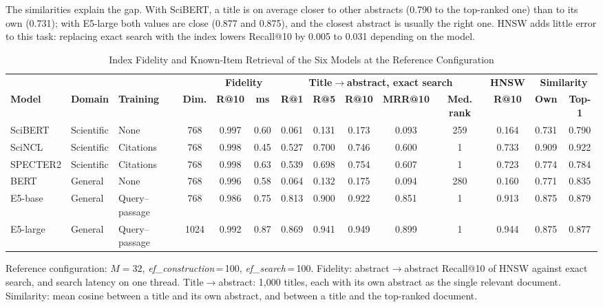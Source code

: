 \documentclass[conference, letterpaper]{IEEEtran}
\begin{document}
The similarities explain the gap. With SciBERT, a title is on average closer to other abstracts (0.790 to the top-ranked one) than to its own (0.731); with E5-large both values are close (0.877 and 0.875), and the closest abstract is usually the right one. HNSW adds little error to this task: replacing exact search with the index lowers Recall@10 by 0.005 to 0.031 depending on the model.

\begin{table}[!t]
\centering
\begin{threeparttable}
\caption{Index Fidelity and Known-Item Retrieval of the Six Models at the Reference Configuration}
\label{tab:models}
\footnotesize
\setlength{\tabcolsep}{4.2pt}
\begin{tabular}{@{}lllc cc ccccc c cc@{}}
\toprule
 & & & & \multicolumn{2}{c}{\textbf{Fidelity}} & \multicolumn{5}{c}{\textbf{Title$\rightarrow$abstract, exact search}} & \textbf{HNSW} & \multicolumn{2}{c}{\textbf{Similarity}} \\
\cmidrule(lr){5-6}\cmidrule(lr){7-11}\cmidrule(lr){12-12}\cmidrule(l){13-14}
\textbf{Model} & \textbf{Domain} & \textbf{Training} & \textbf{Dim.} & \textbf{R@10} & \textbf{ms} & \textbf{R@1} & \textbf{R@5} & \textbf{R@10} & \textbf{MRR@10} & \textbf{Med. rank} & \textbf{R@10} & \textbf{Own} & \textbf{Top-1} \\
\midrule
SciBERT  & Scientific & None           & 768  & 0.997 & 0.60 & 0.061 & 0.131 & 0.173 & 0.093 & 259 & 0.164 & 0.731 & 0.790 \\
SciNCL   & Scientific & Citations      & 768  & 0.998 & 0.45 & 0.527 & 0.700 & 0.746 & 0.600 & 1   & 0.733 & 0.909 & 0.922 \\
SPECTER2 & Scientific & Citations      & 768  & 0.998 & 0.63 & 0.539 & 0.698 & 0.754 & 0.607 & 1   & 0.723 & 0.774 & 0.784 \\
BERT     & General    & None           & 768  & 0.996 & 0.58 & 0.064 & 0.132 & 0.175 & 0.094 & 280 & 0.160 & 0.771 & 0.835 \\
E5-base  & General    & Query--passage & 768  & 0.986 & 0.75 & 0.813 & 0.900 & 0.922 & 0.851 & 1   & 0.913 & 0.875 & 0.879 \\
E5-large & General    & Query--passage & 1024 & 0.992 & 0.87 & 0.869 & 0.941 & 0.949 & 0.899 & 1   & 0.944 & 0.875 & 0.877 \\
\bottomrule
\end{tabular}
\begin{tablenotes}
\scriptsize
\item Reference configuration: $M=32$, \textit{ef\_construction}\,=\,100, \textit{ef\_search}\,=\,100. Fidelity: abstract$\rightarrow$abstract Recall@10 of HNSW against exact search, and search latency on one thread. Title$\rightarrow$abstract: 1,000 titles, each with its own abstract as the single relevant document. Similarity: mean cosine between a title and its own abstract, and between a title and the top-ranked document.
\end{tablenotes}
\end{threeparttable}
\end{table}
\end{document}
